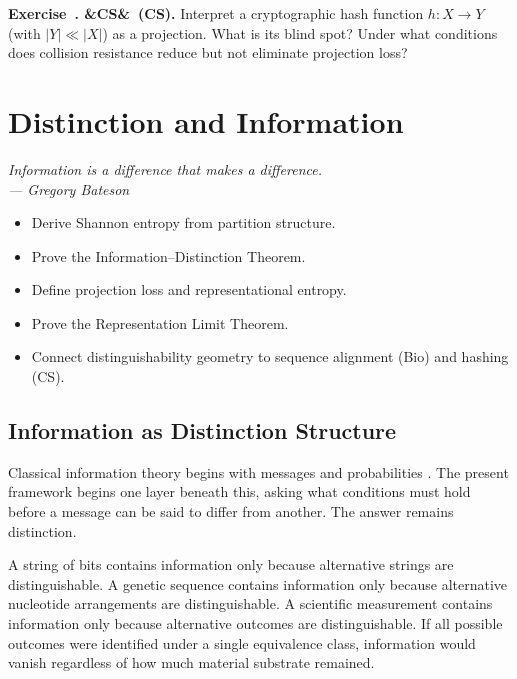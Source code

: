 \documentclass[12pt,twoside,openright]{book}
\newenvironment{epigraph}[2]{%
  \vspace{1em}\begin{flushright}
  \begin{minipage}{0.72\textwidth}
  \itshape\small #1\\[0.4em]
  \upshape\footnotesize\sffamily\color{DistGray}--- #2
  \end{minipage}\end{flushright}\vspace{1.5em}}{}
\newenvironment{objectives}{%
  \begin{tcolorbox}[colback=DistBlue!5,colframe=DistBlue,
    title={\faCheckCircle\enspace Learning Objectives},
    fonttitle=\sffamily\bfseries\color{white},
    attach boxed title to top left={yshift=-2mm,xshift=4mm},
    boxed title style={colback=DistBlue},breakable]
  \begin{itemize}[leftmargin=*,nosep]}{%
  \end{itemize}\end{tcolorbox}\vspace{1em}}
\newcounter{exercise}[chapter]
\newenvironment{exercise}[1][]{%
  \refstepcounter{exercise}%
  \noindent\textbf{\sffamily\color{DistBlue}%
  Exercise~\thechapter.\theexercise%
  \ifx&#1&\else~(#1)\fi.}\enspace}{\par\medskip}
\begin{document}
\begin{exercise}[CS]
  Interpret a cryptographic hash function $h: X \to Y$
  (with $|Y| \ll |X|$) as a projection. What is its
  blind spot? Under what conditions does collision
  resistance reduce but not eliminate projection loss?
\end{exercise}


\chapter{Distinction and Information}
\label{ch:information}

\begin{epigraph}{Information is a difference that makes
  a difference.}%
  {Gregory Bateson \parencite{bateson1972}}
\end{epigraph}

\begin{objectives}
  \item Derive Shannon entropy from partition structure.
  \item Prove the Information--Distinction Theorem.
  \item Define projection loss and representational entropy.
  \item Prove the Representation Limit Theorem.
  \item Connect distinguishability geometry to sequence
        alignment (Bio) and hashing (CS).
\end{objectives}

\section{Information as Distinction Structure}
\label{sec:ch2-info}

Classical information theory begins with messages and
probabilities \parencite{shannon1948,cover2006}.
The present framework begins one layer beneath this,
asking what conditions must hold before a message can
be said to differ from another. The answer remains
distinction. 

A string of bits contains information only because
alternative strings are distinguishable. A genetic
sequence contains information only because alternative
nucleotide arrangements are distinguishable. A scientific
measurement contains information only because alternative
outcomes are distinguishable. If all possible outcomes
were identified under a single equivalence class,
information would vanish regardless of how much material
substrate remained.
\end{document}
